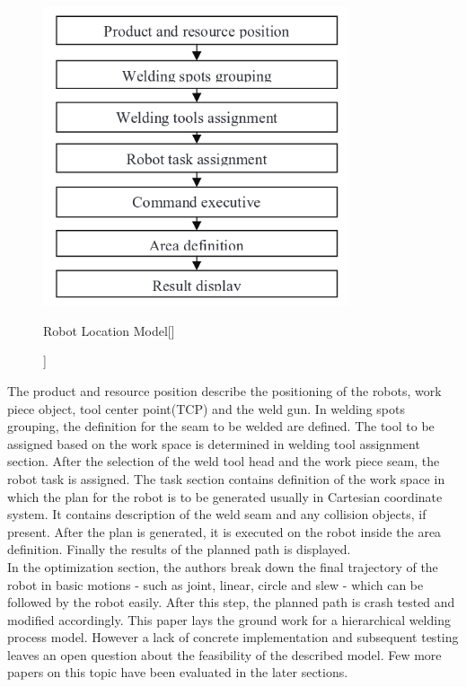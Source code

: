 \begin{figure}[htbp] %
 \centering
   \includegraphics[width=9cm]{images/robotlocproc.png}
   \caption[Robot Location Model[\citet{QiuZhu2011}]]
   {Robot Location Model[\citet{QiuZhu2011}]}  
\label{fig:img6}
\end{figure}
The product and resource position describe the positioning of the robots, work piece object, tool center point(TCP) and the weld gun. In welding spots grouping, the definition for the seam to be welded are defined. The tool to be assigned based on the work space is determined in welding tool assignment section. After the selection of the weld tool head and the work piece seam, the robot task is assigned. The task section contains definition of the work space in which the plan for the robot is to be generated usually in Cartesian coordinate system. It contains description of the weld seam and any collision objects, if present. After the plan is generated, it is executed on the robot inside the area definition. Finally the results of the planned path is displayed. \\ In the optimization section, the authors break down the final trajectory of the robot in basic motions -  such as joint, linear, circle and slew - which can be followed by the robot easily. After this step, the planned path is crash tested and modified accordingly. This paper lays the ground work for a hierarchical welding process model. However a lack of concrete implementation and subsequent testing leaves an open question about the feasibility of the described model. Few more papers on this topic have been evaluated in the later sections.

